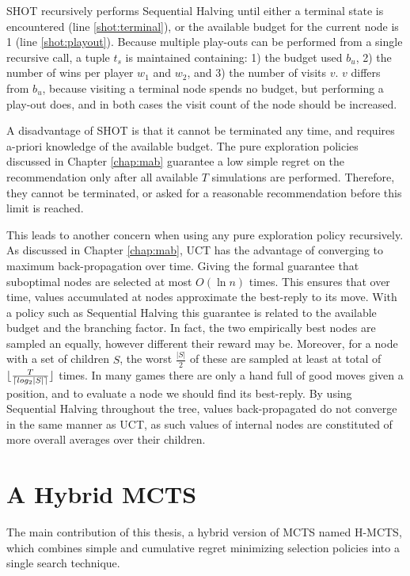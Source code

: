 \documentclass{kecsmstr}
\DeclarePairedDelimiter{\ceil}{\lceil}{\rceil}
\DeclarePairedDelimiter{\floor}{\lfloor}{\rfloor}
\begin{document}
\newpage
SHOT recursively performs Sequential Halving until either a terminal state is encountered (line \ref{shot:terminal}), or the available budget for the current node is 1 (line \ref{shot:playout}). Because multiple play-outs can be performed from a single recursive call, a tuple $t_s$ is maintained containing: 1) the budget used $b_u$, 2) the number of wins per player $w_1$ and $w_2$, and 3) the number of visits $v$. $v$ differs from $b_u$, because visiting a terminal node spends no budget, but performing a play-out does, and in both cases the visit count of the node should be increased.

A disadvantage of SHOT is that it cannot be terminated any time, and requires a-priori knowledge of the available budget. The pure exploration policies discussed in Chapter \ref{chap:mab} guarantee a low simple regret on the recommendation only after all available $T$ simulations are performed. Therefore, they cannot be terminated, or asked for a reasonable recommendation before this limit is reached.

This leads to another concern when using any pure exploration policy recursively. As discussed in Chapter \ref{chap:mab}, UCT has the advantage of converging to maximum back-propagation over time. Giving the formal guarantee that suboptimal nodes are selected at most $O(\ln{n})$ times. This ensures that over time, values accumulated at nodes approximate the best-reply to its move. With a policy such as Sequential Halving this guarantee is related to the available budget and the branching factor. In fact, the two empirically best nodes are sampled an equally, however different their reward may be. Moreover, for a node with a set of children $S$, the worst $\frac{|S|}{2}$ of these are sampled at least at total of $\floor{\frac{T}{\ceil{log_2{|S|}}}}$ times. In many games there are only a hand full of good moves given a position, and to evaluate a node we should find its best-reply. By using Sequential Halving throughout the tree, values back-propagated do not converge in the same manner as UCT, as such values of internal nodes are constituted of more overall averages over their children.

\chapter{A Hybrid MCTS}
\label{chap:hybmcts}
\begin{chaptercontents}
The main contribution of this thesis, a hybrid version of MCTS named H-MCTS, which combines simple and cumulative regret minimizing selection policies into a single search technique.
\end{chaptercontents}
\end{document}
